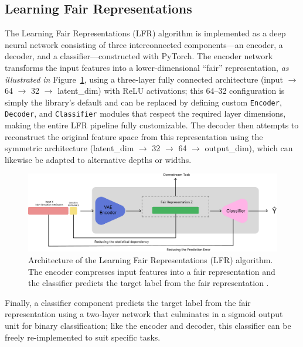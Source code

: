 \documentclass[12pt,a4paper,openright,twoside]{book}
\begin{document}
\subsection{Learning Fair Representations}
The Learning Fair Representations (LFR) algorithm is implemented as a deep neural network consisting of three interconnected components—an encoder, a decoder, and a classifier—constructed with PyTorch. The encoder network transforms the input features into a lower-dimensional “fair” representation, \textit{as illustrated in} Figure~\ref{fig:lfr_architecture}, using a three-layer fully connected architecture (input $\rightarrow$ 64 $\rightarrow$ 32 $\rightarrow$ latent\_dim) with ReLU activations; this 64–32 configuration is simply the library’s default and can be replaced by defining custom \texttt{Encoder}, \texttt{Decoder}, and \texttt{Classifier} modules that respect the required layer dimensions, making the entire LFR pipeline fully customizable. The decoder then attempts to reconstruct the original feature space from this representation using the symmetric architecture (latent\_dim $\rightarrow$ 32 $\rightarrow$ 64 $\rightarrow$ output\_dim), which can likewise be adapted to alternative depths or widths. 

\begin{figure}
\centering
\includegraphics[width=\textwidth]{figures/lfr.pdf}
\caption{Architecture of the Learning Fair Representations (LFR) algorithm. The encoder compresses input features into a fair representation and the classifier predicts the target label from the fair representation \cite{TayebiAidaLfr}.}
\label{fig:lfr_architecture}
\end{figure}

Finally, a classifier component predicts the target label from the fair representation using a two-layer network that culminates in a sigmoid output unit for binary classification; like the encoder and decoder, this classifier can be freely re-implemented to suit specific tasks.
\end{document}

